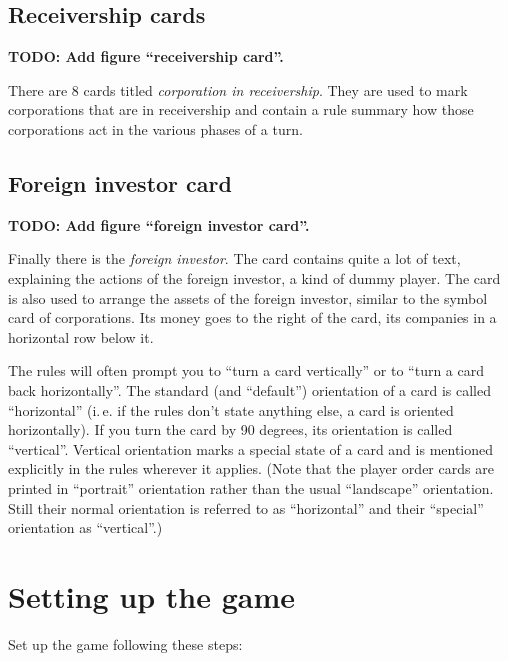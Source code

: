 \documentclass[10pt,final]{report}
\begin{document}
\begin{multicols}{2}
\subsection{Receivership cards}

\textbf{TODO: Add figure ``receivership card''.}

There are 8 cards titled \emph{corporation in receivership}. They are
used to mark corporations that are in receivership and contain a rule
summary how those corporations act in the various phases of a turn.

\subsection{Foreign investor card}

\textbf{TODO: Add figure ``foreign investor card''.}

Finally there is the \emph{foreign investor}. The card contains quite
a lot of text, explaining the actions of the foreign investor, a kind
of dummy player. The card is also used to arrange the assets of the
foreign investor, similar to the symbol card of corporations. Its
money goes to the right of the card, its companies in a horizontal row
below it.

The rules will often prompt you to ``turn a card vertically'' or to
``turn a card back horizontally''. The standard (and ``default'')
orientation of a card is called ``horizontal'' (i.\,e. if the rules
don't state anything else, a card is oriented horizontally). If you
turn the card by 90 degrees, its orientation is called
``vertical''. Vertical orientation marks a special state of a card and
is mentioned explicitly in the rules wherever it applies. (Note that
the player order cards are printed in ``portrait'' orientation rather
than the usual ``landscape'' orientation. Still their normal
orientation is referred to as ``horizontal'' and their ``special''
orientation as ``vertical''.)

\section{Setting up the game}

Set up the game following these steps:


\end{multicols}
\end{document}
